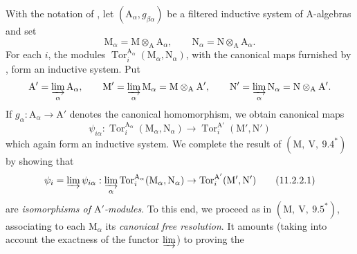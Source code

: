 \begin{env}[11.2.2]
\label{IV.11.2.2}
With the notation of , let
$(\mathrm{A}_\alpha,g_{\beta\alpha})$ be a filtered inductive system of
$\mathrm{A}$-algebras and set
\[
  \mathrm{M}_\alpha=\mathrm{M}\otimes_\mathrm{A}\mathrm{A}_\alpha,
  \qquad
  \mathrm{N}_\alpha=\mathrm{N}\otimes_\mathrm{A}\mathrm{A}_\alpha.
\]
For each $i$, the modules
$\operatorname{Tor}_i^{\mathrm{A}_\alpha}
(\mathrm{M}_\alpha,\mathrm{N}_\alpha)$, with the canonical maps furnished
by , form an inductive system. Put
\[
  \mathrm{A}'=\varinjlim_\alpha\mathrm{A}_\alpha,\qquad
  \mathrm{M}'=\varinjlim_\alpha\mathrm{M}_\alpha
    =\mathrm{M}\otimes_\mathrm{A}\mathrm{A}',\qquad
  \mathrm{N}'=\varinjlim_\alpha\mathrm{N}_\alpha
    =\mathrm{N}\otimes_\mathrm{A}\mathrm{A}'.
\]
If $g_\alpha:\mathrm{A}_\alpha\to\mathrm{A}'$ denotes the canonical
homomorphism, we obtain canonical maps
\[
  \psi_{i\alpha}:
  \operatorname{Tor}_i^{\mathrm{A}_\alpha}
    (\mathrm{M}_\alpha,\mathrm{N}_\alpha)
  \longrightarrow
  \operatorname{Tor}_i^{\mathrm{A}'}(\mathrm{M}',\mathrm{N}')
\]
which again form an inductive system. We complete the result of
$(\mathrm{M},~\mathrm{V},~9.4^*)$ by showing that
\begin{equation}
  \psi_i=\varinjlim\psi_{i\alpha}:\varinjlim_\alpha\operatorname{Tor}_i^{\mathrm{A}_\alpha}(\mathrm{M}_\alpha,\mathrm{N}_\alpha)\to\operatorname{Tor}_i^{\mathrm{A}'}(\mathrm{M}',\mathrm{N}')
  \label{IV.11.2.2.1}
\tag{11.2.2.1}
\end{equation}
are \emph{isomorphisms of $\mathrm{A}'$-modules}. To this end, we proceed as in $(\mathrm{M},~\mathrm{V},~9.5^*)$, associating to each $\mathrm{M}_\alpha$ its \emph{canonical free resolution}. It amounts (taking into account the exactness of the functor $\varinjlim$) to proving the
\end{env}


